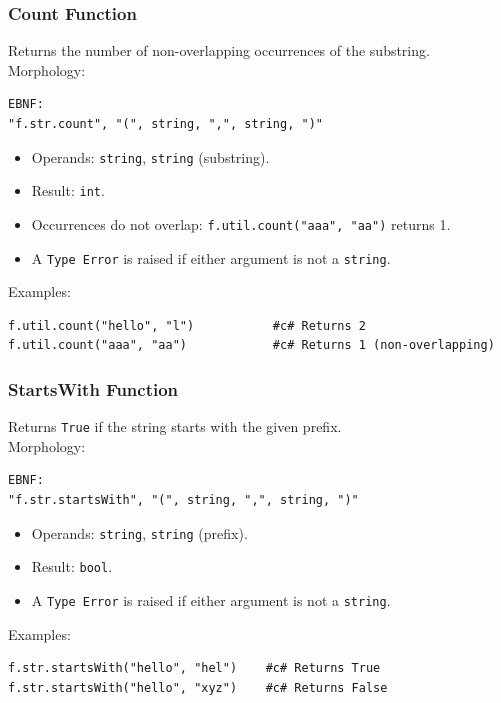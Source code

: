 \subsubsection{Count Function}
Returns the number of non-overlapping occurrences of the substring. \\
Morphology:
\begin{verbatim}
EBNF:
"f.str.count", "(", string, ",", string, ")"
\end{verbatim}
\begin{itemize}
\item Operands: \texttt{string}, \texttt{string} (substring).
\item Result: \texttt{int}.
\item Occurrences do not overlap: \texttt{f.util.count("aaa", "aa")} returns 1.
\item A \texttt{Type Error} is raised if either argument is not a \texttt{string}.
\end{itemize}
Examples:
\begin{verbatim}
f.util.count("hello", "l")           #c# Returns 2
f.util.count("aaa", "aa")            #c# Returns 1 (non-overlapping)
\end{verbatim}

\subsubsection{StartsWith Function}
Returns \texttt{True} if the string starts with the given prefix. \\
Morphology:
\begin{verbatim}
EBNF:
"f.str.startsWith", "(", string, ",", string, ")"
\end{verbatim}
\begin{itemize}
\item Operands: \texttt{string}, \texttt{string} (prefix).
\item Result: \texttt{bool}.
\item A \texttt{Type Error} is raised if either argument is not a \texttt{string}.
\end{itemize}
Examples:
\begin{verbatim}
f.str.startsWith("hello", "hel")    #c# Returns True
f.str.startsWith("hello", "xyz")    #c# Returns False
\end{verbatim}

